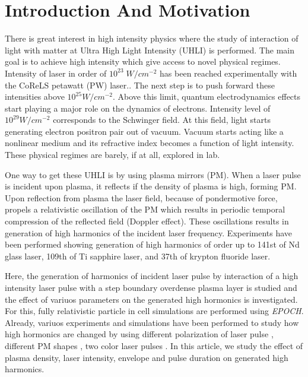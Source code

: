 \documentclass[12pt]{article}
\newenvironment{changemargin}[2]{%
\begin{list}{}{%
\setlength{\topsep}{0pt}%
\setlength{\leftmargin}{#1}%
\setlength{\rightmargin}{#2}%
\setlength{\listparindent}{\parindent}%
\setlength{\itemindent}{\parindent}%
\setlength{\parsep}{\parskip}%
}%
\item[]}{\end{list}}
\begin{document}
\newpage
\begin{changemargin}{-2cm}{-2cm}
    \section{Introduction And Motivation}
    There is great interest in high intensity physics where the study of interaction of light with matter at Ultra High Light Intensity (UHLI) is performed. The main goal is to achieve high intensity which give access to novel physical regimes.\cite{henri}
    Intensity of laser in order of $10^{23} \; W/cm^{-2}$ has been reached experimentally with the CoReLS petawatt (PW) laser.\cite{highintensity}. The next step is to push forward these intensities above $10^{25}W/cm^{-2}$. Above this limit, quantum electrodynamics effects start playing a major role on the dynamics of electrons. Intensity level of $10^{29}W/cm^{-2}$ corresponds to the Schwinger field. At this field, light starts generating electron positron pair out of vacuum. Vacuum starts acting like a nonlinear medium and its refractive index becomes a function of light intensity. These physical regimes are barely, if at all, explored in lab.

    One way to get these UHLI is by using plasma mirrors (PM). When a laser pulse is incident upon plasma, it reflects if the density of plasma is high, forming PM. Upon reflection from plasma the laser field, because of pondermotive force, propels a relativistic oscillation of the PM which results in periodic temporal compression of the reflected field (Doppler effect). These oscillations results in generation of high harmonics of the incident laser frequency.\cite{lichters} Experiments have been performed showing generation of high harmonics of order up to 141st of Nd glass laser\cite{hormonics1}, 109th of Ti sapphire laser\cite{hormonics2}, and 37th of krypton fluoride laser\cite{hormonics3}.

    Here, the generation of harmonics of incident laser pulse by interaction of a high intensity laser pulse with a step boundary overdense plasma layer is studied and the effect of variuos parameters on the generated high hormonics is investigated. For this, fully relativistic particle in cell simulations are performed using \textit{EPOCH}. Already, variuos experiments and simulations have been performed to study how high hormonics are changed by using different polarization of laser pulse \cite{polarization1} \cite{polarization2}, different PM shapes \cite{henri}, two color laser pulses \cite{two-color1} \cite{two-color2}. In this article, we study the effect of plasma density, laser intensity, envelope and pulse duration on generated high harmonics.

\end{changemargin}
\end{document}
